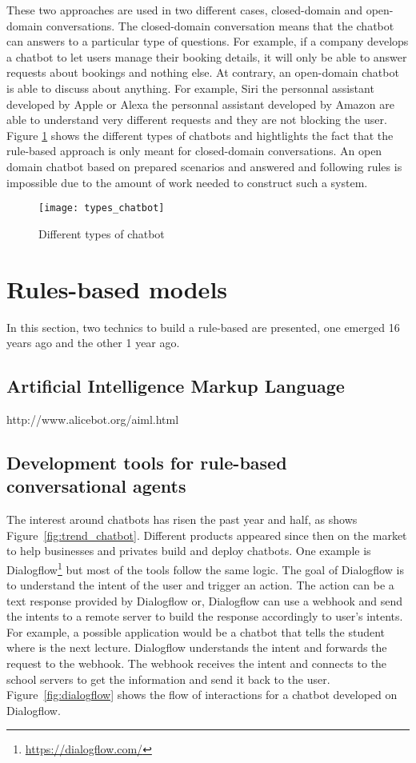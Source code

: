 These two approaches are used in two different cases, closed-domain and open-domain conversations. The closed-domain conversation means that the chatbot can answers to a particular type of questions. For example, if a company develops a chatbot to let users manage their booking details, it will only be able to answer requests about bookings and nothing else. At contrary, an open-domain chatbot is able to discuss about anything. For example, Siri the personnal assistant developed by Apple or Alexa the personnal assistant developed by Amazon are able to understand very different requests and they are not blocking the user. Figure \ref{fig:types_chatbot} shows the different types of chatbots and hightlights the fact that the rule-based approach is only meant for closed-domain conversations. An open domain chatbot based on prepared scenarios and answered and following rules is impossible due to the amount of work needed to construct such a system.

\begin{figure}
    \centering
    \texttt{[image: types\_chatbot]}
    \caption{Different types of chatbot}
    \label{fig:types_chatbot}
\end{figure}

\section{Rules-based models}
In this section, two technics to build a rule-based are presented, one emerged 16 years ago and the other 1 year ago.

\subsection{Artificial Intelligence Markup Language}
http://www.alicebot.org/aiml.html

\subsection{Development tools for rule-based conversational agents}
The interest around chatbots has risen the past year and half, as shows Figure~\ref{fig:trend_chatbot}. Different products appeared since then on the market to help businesses and privates build and deploy chatbots. One example is Dialogflow\footnote{\url{https://dialogflow.com/}} but most of the tools follow the same logic. The goal of Dialogflow is to understand the intent of the user and trigger an action. The action can be a text response provided by Dialogflow or, Dialogflow can use a webhook and send the intents to a remote server to build the response accordingly to user's intents.
For example, a possible application would be a chatbot that tells the student where is the next lecture. Dialogflow understands the intent and forwards the request to the webhook. The webhook receives the intent and connects to the school servers to get the information and send it back to the user. Figure~\ref{fig:dialogflow} shows the flow of interactions for a chatbot developed on Dialogflow.

